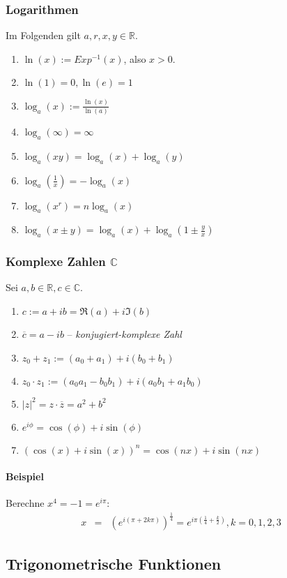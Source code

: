 \documentclass[a4paper, 9pt, DIV=24]{scrartcl}
\begin{document}
\subsubsection{Logarithmen} Im Folgenden gilt $a,r,x,y \in\mathbb{R}$.
\begin{enumerate}[label={(}\arabic*{)}]
 \item $\ln(x) := Exp^{-1}(x)$, also $x > 0$.
 \item $\ln(1) = 0, \ln(e) = 1$
 \item $\log_a(x) := \frac{\ln(x)}{\ln(a)}$
 \item $\log_a(\infty) = \infty$
 \item $\log_a(xy) = \log_a(x)+\log_a(y)$
 \item $\log_a(\frac{1}{x}) = -\log_a(x)$
 \item $\log_a(x^r) = n\log_a(x)$
 \item $\log_a(x \pm y) = \log_a(x) + \log_a(1 \pm \frac{y}{x})$
\end{enumerate}

\subsubsection{Komplexe Zahlen $\mathbb{C}$}
Sei $a,b \in \mathbb{R}, c \in \mathbb{C}$.
\begin{enumerate}[label={(}\arabic*{)}]
 \item $c := a + ib = \Re(a) + i\Im(b)$
 \item $\overline{c} = a - ib$ -- \emph{konjugiert-komplexe Zahl}
 \item $z_0 + z_1 := (a_0 + a_1) + i(b_0 + b_1)$
 \item $z_0 \cdot z_1 := (a_0a_1 - b_0b_1) + i(a_0b_1 + a_1b_0)$
 \item $|z|^2 = z\cdot\overline{z} = a^2 + b^2$
 \item $e^{i\phi}=\cos(\phi)+i\sin(\phi)$
 \item $\left(\cos(x)+i\sin(x)\right)^n=\cos(nx)+i\sin(nx)$
\end{enumerate}
\paragraph*{Beispiel}
Berechne $x^4=-1=e^{i\pi}$:
\begin{eqnarray}
x &=& \left(e^{i(\pi +2k\pi)}\right)^\frac{1}{4} 
= e^{i\pi(\frac{1}{4}+\frac{k}{2})}, k={0,1,2,3} \nonumber
\end{eqnarray}

\subsection{Trigonometrische Funktionen}
\end{document}
